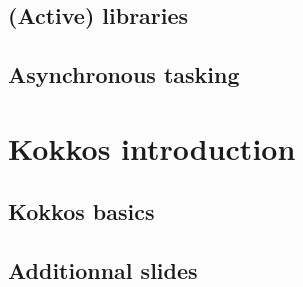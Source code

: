 \documentclass[9pt,hyperref={pdfpagemode=FullScreen,urlcolor=blue},xcolor=x11names]{beamer}
\begin{document}


\subsection{(Active) libraries}



\subsection{Asynchronous tasking}



\section{Kokkos introduction}

\subsection{Kokkos basics}



%

\subsection{Additionnal slides}



\end{document}
